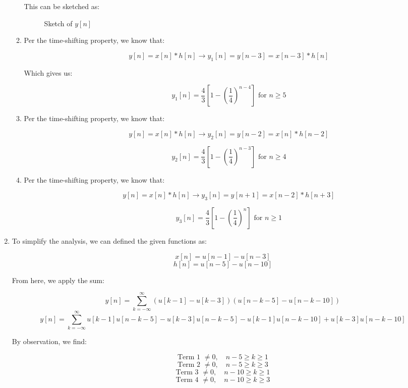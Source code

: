 \begin{enumerate}
\begin{enumerate}
        This can be sketched as:

        \begin{figure}[H]
          \centering
          
          \caption{Sketch of $y[n]$}
          \label{fig:1}
        \end{figure}

      \item 

        Per the time-shifting property, we know that:

        $$y[n]=x[n]*h[n]\to y_1[n]=y[n-3]=x[n-3]*h[n]$$

        Which gives us:

        $$\boxed{y_1[n]=\frac{4}{3}\left[ 1-\left( \frac{1}{4} \right)^{n-4} \right]\text{ for }n\geq 5}$$

      \item 

        Per the time-shifting property, we know that:

        $$y[n]=x[n]*h[n]\to y_2[n]=y[n-2]=x[n]*h[n-2]$$

        $$\boxed{y_2[n]=\frac{4}{3}\left[ 1-\left( \frac{1}{4} \right)^{n-3} \right]\text{ for }n\geq 4}$$

      \item 

        Per the time-shifting property, we know that:

        $$y[n]=x[n]*h[n]\to y_3[n]=y[n+1]=x[n-2]*h[n+3]$$

        $$\boxed{y_3[n]=\frac{4}{3}\left[ 1-\left( \frac{1}{4} \right)^{n} \right]\text{ for }n\geq 1}$$

    \end{enumerate}

  \item

    To simplify the analysis, we can defined the given functions as:

    $$x[n]=u[n-1]-u[n-3]$$
    $$h[n]=u[n-5]-u[n-10]$$

    From here, we apply the sum:

    $$y[n]=\sum_{k=-\infty}^{\infty} (u[k-1]-u[k-3])(u[n-k-5]-u[n-k-10])$$
    $$y[n]=\sum_{k=-\infty}^{\infty} u[k-1]u[n-k-5]-u[k-3]u[n-k-5]-u[k-1]u[n-k-10]+u[k-3]u[n-k-10]$$

    By observation, we find:

    $$\text{Term 1 }\neq 0,\quad n-5\geq k\geq1$$
    $$\text{Term 2 }\neq 0,\quad n-5\geq k\geq3$$
    $$\text{Term 3 }\neq 0,\quad n-10\geq k\geq1$$
    $$\text{Term 4 }\neq 0,\quad n-10\geq k\geq3$$


\end{enumerate}
